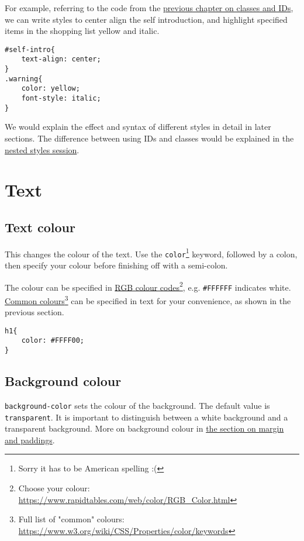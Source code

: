 For example, referring to the code from the \hyperref[sec:classesids]{previous chapter on classes and IDs}, we can write styles to center align the self introduction, and highlight specified items in the shopping list yellow and italic.

\begin{lstlisting}[language=pug]
#self-intro{
    text-align: center;
}
.warning{
    color: yellow;
    font-style: italic;
}
\end{lstlisting}

We would explain the effect and syntax of different styles in detail in later sections. The difference between using IDs and classes would be explained in the \hyperref[sec:nestedstyles]{nested styles session}.

\section{Text}

\subsection{Text colour}

This changes the colour of the text. Use the \texttt{color}\footnote{Sorry it has to be American spelling :(} keyword, followed by a colon, then specify your colour before finishing off with a semi-colon.

The colour can be specified in \href{https://www.rapidtables.com/web/color/RGB_Color.html}{RGB colour codes}\footnote{Choose your colour: \url{https://www.rapidtables.com/web/color/RGB_Color.html}}, e.g. \texttt{\#FFFFFF} indicates white. \href{https://www.w3.org/wiki/CSS/Properties/color/keywords}{Common colours}\footnote{Full list of "common" colours: \url{https://www.w3.org/wiki/CSS/Properties/color/keywords}} can be specified in text for your convenience, as shown in the previous section.

\begin{lstlisting}
h1{
    color: #FFFF00;
}
\end{lstlisting}

\subsection{Background colour}

\texttt{background-color} sets the colour of the background. The default value is \texttt{transparent}. It is important to distinguish between a white background and a transparent background. More on background colour in \hyperref[sec:margin]{the section on margin and paddings}.

